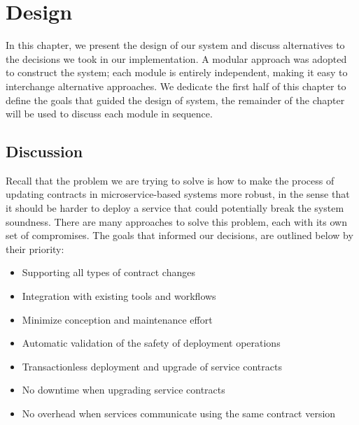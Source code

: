 
%

\chapter{Design}
\label{cha:test}

In this chapter, we present the design of our system and discuss alternatives to the decisions we took in our implementation.
A modular approach was adopted to construct the system;
each module is entirely independent, making it easy to interchange alternative approaches.
We dedicate the first half of this chapter to define the goals that guided the design of system,
the remainder of the chapter will be used to discuss each module in sequence.

\section{Discussion} %
\label{sec:discussion}

Recall that the problem we are trying to solve is how to make the process of updating contracts in
microservice-based systems more robust, in the sense that it should be harder to deploy a service that could
potentially break the system soundness.
There are many approaches to solve this problem, each with its own set of compromises.
The goals that informed our decisions, are outlined below by their priority:

\begin{itemize}
    \item Supporting all types of contract changes
    \item Integration with existing tools and workflows
    \item Minimize conception and maintenance effort
    \item Automatic validation of the safety of deployment operations
    \item Transactionless deployment and upgrade of service contracts
    \item No downtime when upgrading service contracts
    \item No overhead when services communicate using the same contract version
\end{itemize}

